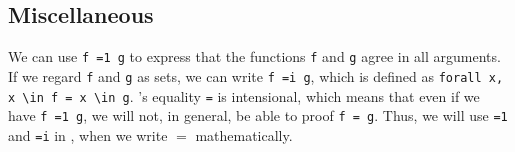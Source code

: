 \subsection{Miscellaneous}
We can use \lstinline{f =1 g} to express that the functions \lstinline{f} and \lstinline{g} agree in all arguments.
If we regard \lstinline{f} and \lstinline{g} as sets, we can write \lstinline{f =i g}, which is defined as \lstinline{forall x, x \in f = x \in g}.
\coq's equality \lstinline{=} is intensional, which means that even if we have \lstinline{f =1 g}, we will not, in general, be able to proof \lstinline{f = g}.
Thus, we will use \lstinline{=1} and \lstinline{=i} in \coq, when we write $=$ mathematically. 



